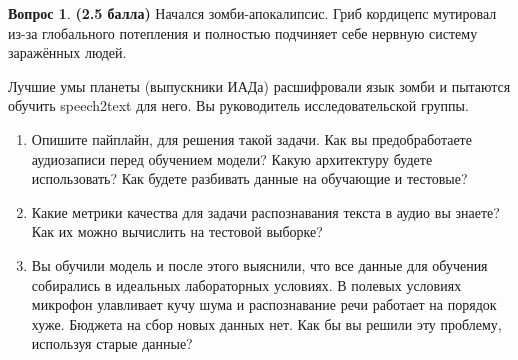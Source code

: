 \documentclass[12pt]{article}
\theoremstyle{definition}
\newtheorem{question}{Вопрос}
\begin{document}
\begin{question} \textbf{(2.5 балла)} \newline
    Начался зомби-апокалипсис. Гриб кордицепс мутировал из-за глобального потепления и полностью подчиняет себе нервную систему заражённых людей.

    Лучшие умы планеты (выпускники ИАДа) расшифровали язык зомби и пытаются обучить speech2text для него. Вы руководитель исследовательской группы.     
    \begin{enumerate}
        \item  Опишите пайплайн, для решения такой задачи. Как вы предобработаете аудиозаписи перед обучением модели? Какую архитектуру будете использовать? Как будете разбивать данные на обучающие и тестовые?
        
        \item Какие метрики качества для задачи распознавания текста в аудио вы знаете? Как их можно вычислить на тестовой выборке?
        
        \item Вы обучили модель и после этого выяснили, что все данные для обучения собирались в идеальных лабораторных условиях. В полевых условиях микрофон улавливает кучу шума и распознавание речи работает на порядок хуже. Бюджета на сбор новых данных нет. Как бы вы решили эту проблему, используя старые данные?
    \end{enumerate}
\end{question}
\end{document}
